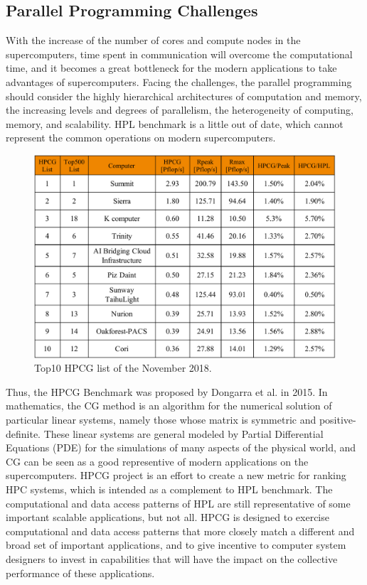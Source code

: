 \subsection{Parallel Programming Challenges} \label{Parallel Programming Challenges}

With the increase of the number of cores and compute nodes in the supercomputers, time spent in communication will overcome the computational time, and it becomes a great bottleneck for the modern applications to take advantages of supercomputers. Facing the challenges, the parallel programming should consider the highly hierarchical architectures of computation and memory, the increasing levels and degrees of parallelism, the heterogeneity of computing, memory, and scalability. HPL benchmark is a little out of date, which cannot represent the common operations on modern supercomputers.

\begin{figure}[htbp]
	\centering
	\includegraphics[width=0.99\linewidth]{fig/top500_hpcg.pdf}
	\caption{Top10 HPCG list of the November 2018.}
	\label{top500-hpxg}
\end{figure}

Thus, the  HPCG Benchmark \cite{dongarra2015hpcg} was proposed by Dongarra et al. in 2015. In mathematics, the CG method is an algorithm for the numerical solution of particular linear systems, namely those whose matrix is symmetric and positive-definite. These linear systems are general modeled  by Partial Differential Equations (PDE)  for the simulations of many aspects of the physical world, and CG can be seen as a good representive of modern applications on the supercomputers. HPCG project is an effort to create a new metric for ranking HPC systems, which is intended as a complement to HPL benchmark. The computational and data access patterns of HPL are still representative of some important scalable applications, but not all. HPCG is designed to exercise computational and data access patterns that more closely match a different and broad set of important applications, and to give incentive to computer system designers to invest in capabilities that will have the impact on the collective performance of these applications.

